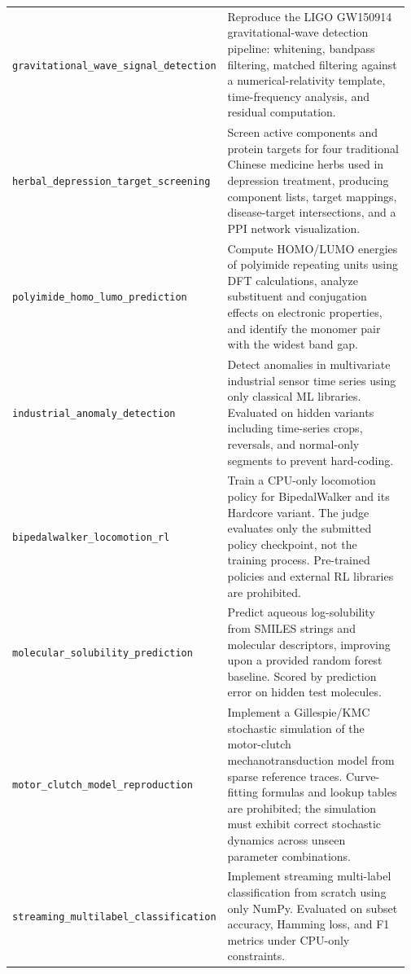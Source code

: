 \begin{longtable}{@{}>{\raggedright\arraybackslash}p{0.20\linewidth}>{\raggedright\arraybackslash}p{0.77\linewidth}@{}}
\tasknoterule
\texttt{gravitational\_\allowbreak{}wave\_\allowbreak{}signal\_\allowbreak{}detection} & Reproduce the LIGO GW150914 gravitational-wave detection pipeline: whitening, bandpass filtering, matched filtering against a numerical-relativity template, time-frequency analysis, and residual computation. \\
\tasknoterule
\texttt{herbal\_\allowbreak{}depression\_\allowbreak{}target\_\allowbreak{}screening} & Screen active components and protein targets for four traditional Chinese medicine herbs used in depression treatment, producing component lists, target mappings, disease-target intersections, and a PPI network visualization. \\
\tasknoterule
\texttt{polyimide\_\allowbreak{}homo\_\allowbreak{}lumo\_\allowbreak{}prediction} & Compute HOMO/LUMO energies of polyimide repeating units using DFT calculations, analyze substituent and conjugation effects on electronic properties, and identify the monomer pair with the widest band gap. \\
\tasknoterule
\texttt{industrial\_\allowbreak{}anomaly\_\allowbreak{}detection} & Detect anomalies in multivariate industrial sensor time series using only classical ML libraries. Evaluated on hidden variants including time-series crops, reversals, and normal-only segments to prevent hard-coding. \\
\tasknoterule
\texttt{bipedalwalker\_\allowbreak{}locomotion\_\allowbreak{}rl} & Train a CPU-only locomotion policy for BipedalWalker and its Hardcore variant. The judge evaluates only the submitted policy checkpoint, not the training process. Pre-trained policies and external RL libraries are prohibited. \\
\tasknoterule
\texttt{molecular\_\allowbreak{}solubility\_\allowbreak{}prediction} & Predict aqueous log-solubility from SMILES strings and molecular descriptors, improving upon a provided random forest baseline. Scored by prediction error on hidden test molecules. \\
\tasknoterule
\texttt{motor\_\allowbreak{}clutch\_\allowbreak{}model\_\allowbreak{}reproduction} & Implement a Gillespie/KMC stochastic simulation of the motor-clutch mechanotransduction model from sparse reference traces. Curve-fitting formulas and lookup tables are prohibited; the simulation must exhibit correct stochastic dynamics across unseen parameter combinations. \\
\tasknoterule
\texttt{streaming\_\allowbreak{}multilabel\_\allowbreak{}classification} & Implement streaming multi-label classification from scratch using only NumPy. Evaluated on subset accuracy, Hamming loss, and F1 metrics under CPU-only constraints. \\

\end{longtable}
